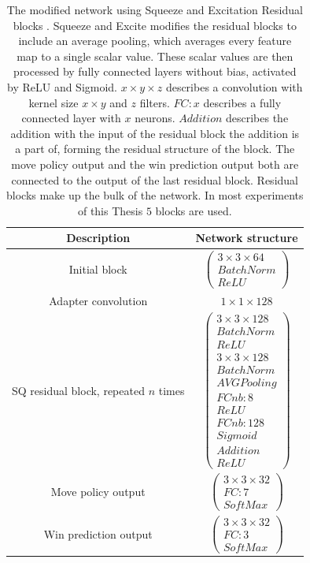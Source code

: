 \documentclass[12pt,onecolumn,oneside,titlepage]{article}
\begin{document}
\begin{table} [H]
 \centering
  \begin{tabular}{c | c }
   Description & Network structure \\
   \hline
   \hline
   Initial block & $\begin{pmatrix} 3 \times 3 \times 64 \\ BatchNorm \\ ReLU \end{pmatrix}$ \\
   \hline
   Adapter convolution & $1 \times 1 \times 128$ \\
   \hline
   SQ residual block, repeated $n$ times & $\begin{pmatrix} 3 \times 3 \times 128 \\ BatchNorm \\ ReLU \\ 3 \times 3 \times 128 \\ BatchNorm \\ AVG Pooling \\ FCnb: 8 \\ ReLU \\ FCnb: 128 \\ Sigmoid \\ Addition \\ ReLU \end{pmatrix}$ \\
   \hline 
   Move policy output & $\begin{pmatrix} 3 \times 3 \times 32 \\ FC: 7 \\ SoftMax \end{pmatrix}$ \\
   \hline
   Win prediction output & $\begin{pmatrix} 3 \times 3 \times 32 \\ FC: 3 \\ SoftMax \end{pmatrix}$
  \end{tabular}
  \caption{The modified network using Squeeze and Excitation Residual blocks \cite{hu2018squeeze}.
  Squeeze and Excite modifies the residual blocks to include an average pooling, which averages every feature map to a single scalar value. These scalar values are then processed by fully connected layers without bias, activated by ReLU and Sigmoid.
  $x \times y \times z$ describes a convolution with kernel size $x \times y$ and $z$ filters. $FC: x$ describes a fully connected layer with $x$ neurons. $Addition$ describes the addition with the input of the residual block the addition is a part of, forming the residual structure of the block.
  The move policy output and the win prediction output both are connected 
  to the output of the last residual block. Residual blocks make up the bulk of the network. In most experiments of this Thesis $5$ blocks are used.}
  \label{fig:sq_blocks_network}
\end{table}
\end{document}
